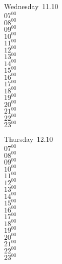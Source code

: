 \documentclass[11pt, a4paper]{book}\usepackage[]{graphicx}\usepackage[]{color}
\begin{document}
\begin{weekdaybox}
  Wednesday~11.10\\
  { 
  \vfill
  $07^{00}$\\
$08^{00}$\\
$09^{00}$\\
$10^{00}$\\
$11^{00}$\\
$12^{00}$\\
$13^{00}$\\
$14^{00}$\\
$15^{00}$\\
$16^{00}$\\
$17^{00}$\\
$18^{00}$\\
$19^{00}$\\
$20^{00}$\\
$21^{00}$\\
$22^{00}$\\
$23^{00}$\\
  }
\end{weekdaybox}
\clearpage
\begin{headerbox}
\end{headerbox}
\begin{weekdaybox}
  Thursday~12.10\\
  { 
  \vfill
  $07^{00}$\\
$08^{00}$\\
$09^{00}$\\
$10^{00}$\\
$11^{00}$\\
$12^{00}$\\
$13^{00}$\\
$14^{00}$\\
$15^{00}$\\
$16^{00}$\\
$17^{00}$\\
$18^{00}$\\
$19^{00}$\\
$20^{00}$\\
$21^{00}$\\
$22^{00}$\\
$23^{00}$\\
  }
\end{weekdaybox} 
\end{document}
